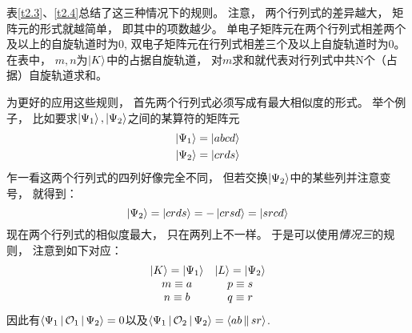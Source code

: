 表\ref{t2.3}、\ref{t2.4}总结了这三种情况下的规则。
注意，
两个行列式的差异越大，
矩阵元的形式就越简单，
即其中的项数越少。
单电子矩阵元在两个行列式相差两个及以上的自旋轨道时为0, 
双电子矩阵元在行列式相差三个及以上自旋轨道时为0。
在表中，
$m,n$为$\Ket{K}$中的占据自旋轨道，
对$m$求和就代表对行列式中共N个（占据）自旋轨道求和。


为更好的应用这些规则，
首先两个行列式必须写成有最大相似度的形式。
举个例子，
比如要求$\Ket{\Psi_1},\Ket{\Psi_2}$之间的某算符的矩阵元
\begin{align}
\Ket{\Psi_1}=\Ket{abcd}\notag\\
\Ket{\Psi_2}=\Ket{crds}\notag
\end{align}
乍一看这两个行列式的四列好像完全不同，
但若交换$\Ket{\Psi_2}$中的某些列并注意变号，
就得到：
\begin{equation*}
\Ket{\Psi_2}=\Ket{crds}=-\Ket{crsd}=\Ket{srcd}
\end{equation*}
现在两个行列式的相似度最大，
只在两列上不一样。
于是可以使用{\textit{情况三}}的规则，
注意到如下对应：
\[\begin{array}{cc}
\Ket{K}=\Ket{\Psi_1}&\Ket{L}=\Ket{\Psi_2}\\
m\equiv a & p\equiv s\\
n\equiv b &q\equiv r
\end{array}\]
因此有$\Braket{\Psi_1|\mathcal{O}_1|\Psi_2}=0$以及$\Braket{\Psi_1|\mathcal{O}_2|\Psi_2}=\Braket{ab||sr}$.


